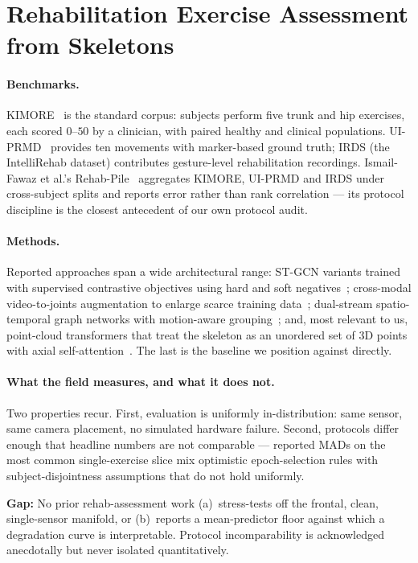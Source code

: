 \documentclass[11pt]{article}
\newcommand{\gap}[1]{\textbf{\textcolor{red!60!black}{Gap:} } #1}
\begin{document}
\section{Rehabilitation Exercise Assessment from Skeletons}
\label{sec:rehab}

\paragraph{Benchmarks.} KIMORE~\cite{capecci2019kimore} is the standard corpus:
subjects perform five trunk and hip exercises, each scored $0$--$50$ by a
clinician, with paired healthy and clinical populations. UI-PRMD~\cite{vakanski2018uiprmd}
provides ten movements with marker-based ground truth; IRDS (the
IntelliRehab dataset) contributes gesture-level rehabilitation recordings.
Ismail-Fawaz et al.'s Rehab-Pile~\cite{rehabpile2026} aggregates KIMORE, UI-PRMD and
IRDS under cross-subject splits and reports error rather than rank correlation ---
its protocol discipline is the closest antecedent of our own protocol audit.

\paragraph{Methods.} Reported approaches span a wide architectural range:
ST-GCN variants trained with supervised contrastive objectives using hard and soft
negatives~\cite{karlov2024}; cross-modal video-to-joints augmentation to enlarge
scarce training data~\cite{abedi2023}; dual-stream spatio-temporal graph networks
with motion-aware grouping~\cite{kuang2026}; and, most relevant to us, point-cloud
transformers that treat the skeleton as an unordered set of $3$D points with axial
self-attention~\cite{pct2026}. The last is the baseline we position against
directly.

\paragraph{What the field measures, and what it does not.} Two properties recur.
First, evaluation is uniformly in-distribution: same sensor, same camera placement,
no simulated hardware failure. Second, protocols differ enough that headline
numbers are not comparable --- reported MADs on the most common single-exercise
slice mix optimistic epoch-selection rules with subject-disjointness assumptions
that do not hold uniformly.

\gap{No prior rehab-assessment work (a)~stress-tests off the frontal, clean,
single-sensor manifold, or (b)~reports a mean-predictor floor against which a
degradation curve is interpretable. Protocol incomparability is acknowledged
anecdotally but never isolated quantitatively.}
\end{document}

